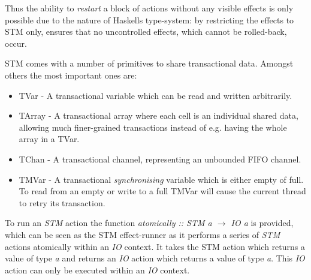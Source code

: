 Thus the ability to \textit{restart} a block of actions without any visible effects is only possible due to the nature of Haskells type-system: by restricting the effects to STM only, ensures that no uncontrolled effects, which cannot be rolled-back, occur.

STM comes with a number of primitives to share transactional data. Amongst others the most important ones are:

\begin{itemize}
	\item TVar - A transactional variable which can be read and written arbitrarily. 
	\item TArray - A transactional array where each cell is an individual shared data, allowing much finer-grained transactions instead of e.g. having the whole array in a TVar.
	\item TChan - A transactional channel, representing an unbounded FIFO channel.
	\item TMVar - A transactional \textit{synchronising} variable which is either empty of full. To read from an empty or write to a full TMVar will cause the current thread to retry its transaction.
\end{itemize}

To run an \textit{STM} action the function \textit{atomically :: STM a $\to$ IO a} is provided, which can be seen as the STM effect-runner as it performs a series of \textit{STM} actions atomically within an \textit{IO} context. It takes the STM action which returns a value of type \textit{a} and returns an \textit{IO} action which returns a value of type \textit{a}. This \textit{IO} action can only be executed within an \textit{IO} context.